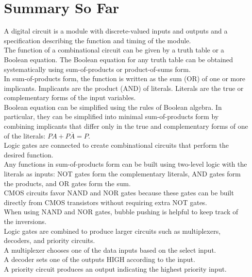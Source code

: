 \documentclass[12pt]{article}
\theoremstyle{definition}
\begin{document}
  \section{Summary So Far}
  A digital circuit is a module with discrete-valued inputs and outputs and a specification describing the function and timing of the module. \\

  The function of a combinational circuit can be given by a truth table or a Boolean equation. The Boolean equation for any truth table can be obtained systematically using sum-of-products or product-of-sums form. \\
  In sum-of-products form, the function is written as the sum (OR) of one or more implicants.
  Implicants are the product (AND) of literals.
  Literals are the true or complementary forms of the input variables.  \\

  Boolean equation can be simplified using the rules of Boolean algebra.
  In particular, they can be simplified into minimal sum-of-products form by combining implicants that differ only in the true and complementary forms of one of the literals: $PA + P\overline{A} = P$. \\

  Logic gates are connected to create combinational circuits that perform the desired function. \\
  Any functions in sum-of-products form can be built using two-level logic with the literals as inputs: NOT gates form the complementary literals, AND gates form the products, and OR gates form the sum. \\
  CMOS circuits favor NAND and NOR gates because these gates can be built directly from CMOS transistors without requiring extra NOT gates. \\
  When using NAND and NOR gates, bubble pushing is helpful to keep track of the inversions. \\

  Logic gates are combined to produce larger circuits such as multiplexers, decoders, and priority circuits. \\
  A multiplexer chooses one of the data inputs based on the select input. \\
  A decoder sets one of the outputs HIGH according to the input. \\
  A priority circuit produces an output indicating the highest priority input. \\
\end{document}
